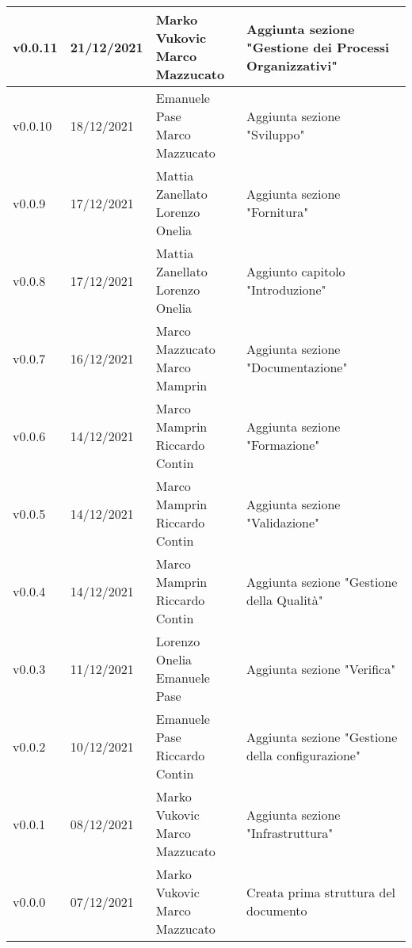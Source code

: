 \begin{center}
\begin{longtable}{|p{1.8cm}|p{2.2cm}|p{4.2cm}|p{4.6cm}|}
      v0.0.11           & 21/12/2021    & \aCapo{Marko Vukovic\\Marco Mazzucato} & Aggiunta sezione "Gestione dei Processi Organizzativi" \\ \hline
      v0.0.10           & 18/12/2021    & \aCapo{Emanuele Pase\\Marco Mazzucato} & Aggiunta sezione "Sviluppo" \\ \hline
      v0.0.9            & 17/12/2021    & \aCapo{Mattia Zanellato\\Lorenzo Onelia} & Aggiunta sezione "Fornitura" \\ \hline
      v0.0.8            & 17/12/2021    & \aCapo{Mattia Zanellato\\Lorenzo Onelia} & Aggiunto capitolo "Introduzione" \\ \hline
      v0.0.7            & 16/12/2021    & \aCapo{Marco Mazzucato\\Marco Mamprin} & Aggiunta sezione "Documentazione" \\ \hline
      v0.0.6            & 14/12/2021    & \aCapo{Marco Mamprin\\Riccardo Contin} & Aggiunta sezione "Formazione" \\ \hline
      v0.0.5            & 14/12/2021    & \aCapo{Marco Mamprin\\Riccardo Contin}   & Aggiunta sezione "Validazione" \\ \hline
      v0.0.4            & 14/12/2021    & \aCapo{Marco Mamprin\\Riccardo Contin}   & Aggiunta sezione "Gestione della Qualità" \\ \hline
      v0.0.3            & 11/12/2021    & \aCapo{Lorenzo Onelia\\Emanuele Pase} & Aggiunta sezione "Verifica" \\ \hline
      v0.0.2            & 10/12/2021    & \aCapo{Emanuele Pase\\Riccardo Contin}  & Aggiunta sezione "Gestione della configurazione" \\ \hline
      v0.0.1            & 08/12/2021    & \aCapo{Marko Vukovic\\Marco Mazzucato}   & Aggiunta sezione "Infrastruttura" \\ \hline
      v0.0.0            & 07/12/2021    & \aCapo{Marko Vukovic\\Marco Mazzucato}   & Creata prima struttura del documento \\ \hline
  \end{longtable}
\end{center}
